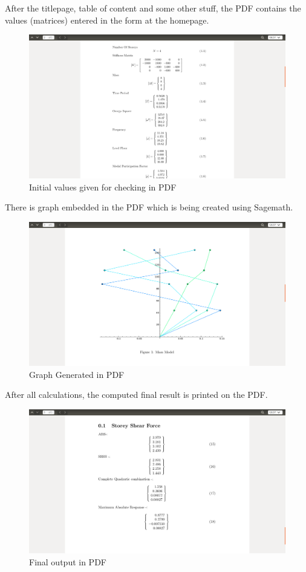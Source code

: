 After the titlepage, table of content and some other stuff, the PDF contains 
the values (matrices) entered in the form at the homepage.
\begin{figure} 
\centering \includegraphics[scale=0.31]{images/output/7.png}
\caption{Initial values given for checking in PDF}
\end{figure}

There is graph embedded in the PDF which is being created using Sagemath.
\begin{figure} 
\centering \includegraphics[scale=0.31]{images/output/8.png}
\caption{Graph Generated in PDF}
\end{figure}

After all calculations, the computed final result is printed on the PDF.
\begin{figure} 
\centering \includegraphics[scale=0.31]{images/output/9.png}
\caption{Final output in PDF}
\end{figure}
